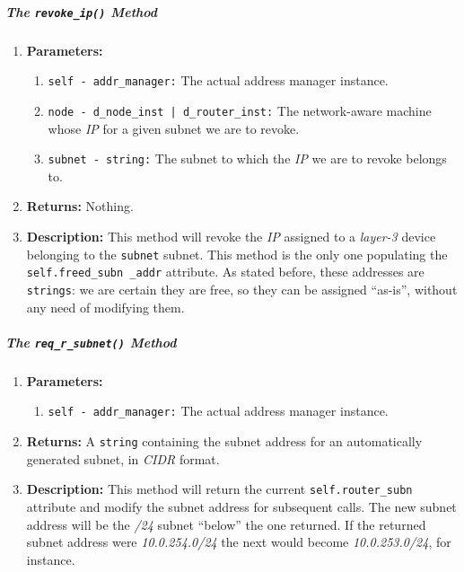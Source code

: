         \subparagraph{The \texttt{revoke\_ip()} Method}
            \begin{enumerate}
                \item \textbf{Parameters:}
                \begin{enumerate}
                    \item \texttt{self - addr\_manager:} The actual address manager instance.
                    \item \texttt{node - d\_node\_inst | d\_router\_inst:} The network-aware machine whose \textit{IP} for a given subnet we are to revoke.
                    \item \texttt{subnet - string:} The subnet to which the \textit{IP} we are to revoke belongs to.
                \end{enumerate}
                \item \textbf{Returns:} Nothing.
                \item \textbf{Description:} This method will revoke the \textit{IP} assigned to a \textit{layer-3} device belonging to the \texttt{subnet} subnet. This method is the only one populating the \texttt{self.freed\_subn \_addr} attribute. As stated before, these addresses are \texttt{strings}: we are certain they are free, so they can be assigned ``as-is'', without any need of modifying them.
            \end{enumerate}

        \subparagraph{The \texttt{req\_r\_subnet()} Method}
            \begin{enumerate}
                \item \textbf{Parameters:}
                \begin{enumerate}
                    \item \texttt{self - addr\_manager:} The actual address manager instance.
                \end{enumerate}
                \item \textbf{Returns:} A \texttt{string} containing the subnet address for an automatically generated subnet, in \textit{CIDR} format.
                \item \textbf{Description:} This method will return the current \texttt{self.router\_subn} attribute and modify the subnet address for subsequent calls. The new subnet address will be the \textit{/24} subnet ``below'' the one returned. If the returned subnet address were \textit{10.0.254.0/24} the next would become \textit{10.0.253.0/24}, for instance.
            \end{enumerate}

